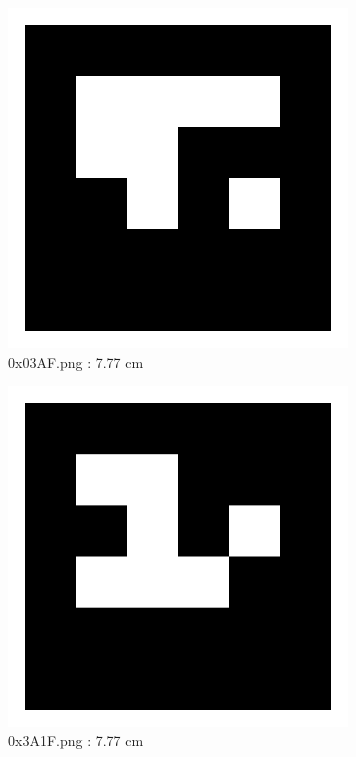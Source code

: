 \documentclass[11pt,a4,BCOR=0cm]{scrartcl}
\begin{document}
\begin{figure}
  \centering
    \includegraphics[natwidth=400,natheight=400,width=9cm]{0x03AF.png}
    \caption{0x03AF.png : 7.77 cm}
    \label{fig:0x03AF.png}
  
\end{figure} 

\begin{figure}
  \centering
    \includegraphics[natwidth=400,natheight=400,width=9cm]{0x3A1F.png}
    \caption{0x3A1F.png : 7.77 cm}
    \label{fig:0x3A1F.png}
  
\end{figure} 

\clearpage
\end{document}
